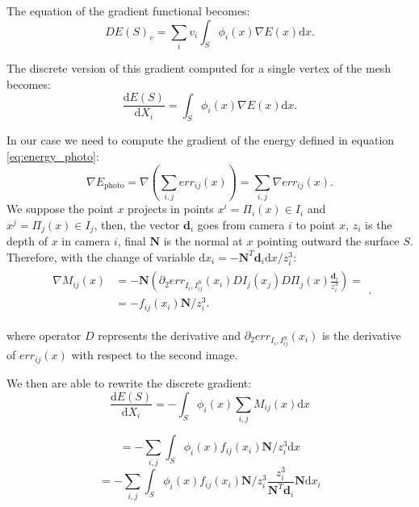 The equation of the gradient functional becomes:
\begin{equation}
  DE(\mathit{S})_v = \sum_i v_i \int_{\mathit{S}} \phi_i(x) \nabla E(x) \textrm{d}x.
\end{equation}

The discrete version of this gradient computed for a single vertex of the mesh becomes:
\begin{equation}
  \frac{\textrm{d}E(\mathit{S})}{\textrm{d}X_i} =  \int_{\mathit{S}} \phi_i(x) \nabla E(x) \textrm{d}x.
\end{equation}

In our case we need to compute the gradient of the energy defined in equation \eqref{eq:energy_photo}:
\begin{equation}
  \nabla E_{\textrm{photo}} = \nabla (\sum_{i,j} err_{ij}(x)) = \sum_{i,j} \nabla err_{ij}(x).
\end{equation}
We suppose the point $x$ projects in points $x^i = \Pi_i(x) \in I_i$ and  $x^j = \Pi_j(x) \in I_j$, then, the vector $\mathbf{d}_i$ goes from camera $i$ to point $x$, $z_i$ is the depth of $x$ in camera $i$, final $\mathbf{N}$ is the normal at $x$ pointing outward the surface $\mathit{S}$. 
Therefore, with the change of variable $\textrm{d}x_i = -\mathbf{N}^T \mathbf{d}_i \textrm{d}x/z_i^3$:
\begin{align}
 \begin{split}
  \nabla \mathit{M}_{ij}(x)& = -\mathbf{N} \left( \partial_2 err_{I_i, I_{ij}^{\mathit{S}}}(x_i) DI_j(x_j) D\Pi_j(x)\frac{\mathbf{d}_i}{z_i^3}\right)=\\
  &= - f_{ij}(x_i) \mathbf{N}/z_i^3.
 \end{split}.
\end{align}
    
where operator $D$ represents the derivative and $\partial_2 err_{I_i, I_{ij}^{\mathit{S}}}(x_i)$ is the derivative of $err_{ij}(x)$ with respect to the second image.


We then are able to rewrite the discrete gradient:
\begin{equation}
  \frac{\textrm{d}E(\mathit{S})}{\textrm{d}X_i} =  - \int_{\mathit{S}} \phi_i(x) \sum_{i,j} \mathit{M}_{ij}(x) \textrm{d}x 
\end{equation}

\begin{equation}
  =  - \sum_{i,j} \int_{\mathit{S}} \phi_i(x)  f_{ij}(x_i)  \mathbf{N}/z_i^3 \textrm{d}x 
\end{equation}
\begin{equation}
  =  - \sum_{i,j} \int_{\mathit{S}} \phi_i(x)  f_{ij}(x_i)  \mathbf{N}/z_i^3 \frac{z_i^3}{\mathbf{N}^T \mathbf{d}_i }\mathbf{N} \textrm{d}x_i
\end{equation}

